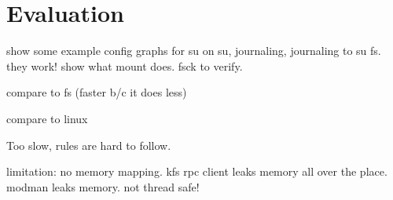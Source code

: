 \section{Evaluation}
\label{sec:eval}

show some example config graphs for su on su, journaling, journaling
to su fs. they work! show what mount does. fsck to verify.

compare to fs (faster b/c it does less)

compare to linux

Too slow, rules are hard to follow.

limitation: no memory mapping. kfs rpc client leaks memory all over
the place. modman leaks memory. not thread safe!
